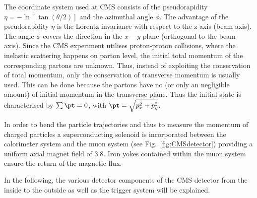The coordinate system used at CMS consists of the pseudorapidity $\eta = -\ln \left[ \tan{\left(\theta/2\right)} \right]$ and the azimuthal angle $\phi$.
The advantage of the pseudorapidity $\eta$ is the Lorentz invariance with respect to the z-axis (beam axis).
The angle $\phi$ covers the direction in the $x-y$ plane (orthogonal to the beam axis).
Since the CMS experiment utilises proton-proton collisions, where the inelastic scattering happens on parton level, the initial total momentum of the corresponding partons are unknown.
Thus, instead of exploiting the conservation of total momentum, only the conservation of transverse momentum is usually used.
This can be done because the partons have no (or only an negligible amount) of initial momentum in the transverse plane.
Thus the initial state is characterised by $\sum{\pt}=0$, with $\pt = \sqrt{p_x^2 + p_y^2}$.

In order to bend the particle trajectories and thus to measure the momentum of charged particles a superconducting solenoid is incorporated between the calorimeter system and the muon system (see Fig.~\ref{fig:CMSdetector}) providing a uniform axial magnet field of 3.8\tesla.
Iron yokes contained within the muon system ensure the return of the magnetic flux. 

In the following, the various detector components of the CMS detector from the inside to the outside as well as the trigger system will be explained.
\FloatBarrier

